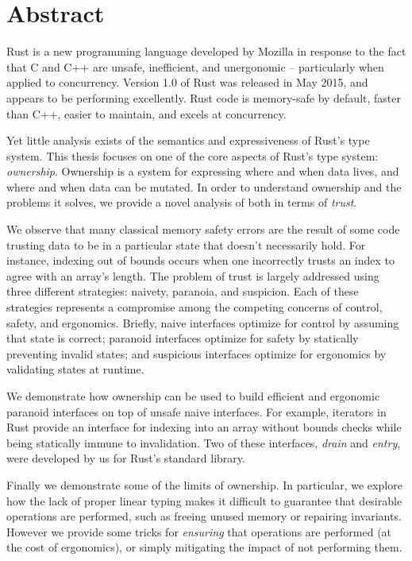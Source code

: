{}
\begingroup
\let\clearpage\relax
\let\cleardoublepage\relax
\let\cleardoublepage\relax

\chapter*{Abstract}
Rust is a new programming language developed by Mozilla in response to the fact
that C and C++ are unsafe, inefficient, and unergonomic -- particularly when
applied to concurrency. Version 1.0 of Rust was released in May 2015, and appears
to be performing excellently. Rust code is memory-safe
by default, faster than C++, easier to maintain, and excels at concurrency.

Yet little analysis exists of the semantics and expressiveness of Rust's type
system. This thesis focuses on one of the core aspects of Rust's type system:
\emph{ownership}. Ownership is a system for expressing where and when data lives, and
where and when data can be mutated. In order to understand ownership and the
problems it solves, we provide a novel analysis of both in terms of \emph{trust}.

We observe that many classical memory safety errors are the result of some
code trusting data to be in a particular state that doesn't necessarily hold.
For instance, indexing out of bounds occurs when one incorrectly trusts an
index to agree with an array's length. The problem of trust is largely addressed using three
different strategies: naivety, paranoia, and suspicion. Each of these strategies
represents a compromise among the competing concerns of control, safety, and
ergonomics. Briefly, naive interfaces optimize for control by assuming that
state is correct; paranoid interfaces optimize for safety by statically preventing
invalid states; and suspicious interfaces optimize for ergonomics by validating
states at runtime.

We demonstrate how ownership can be used to build efficient and ergonomic
paranoid interfaces on top of unsafe naive interfaces. For example,
iterators in Rust provide an interface for indexing into an array
without bounds checks while being statically immune to invalidation.
Two of these interfaces, \emph{drain} and \emph{entry}, were developed by us for Rust's
standard library.

Finally we demonstrate some of the limits of ownership. In particular, we
explore how the lack of proper linear typing makes it difficult to guarantee
that desirable operations are performed, such as freeing unused memory or
repairing invariants. However we provide some tricks for \emph{ensuring} that operations
are performed (at the cost of ergonomics), or simply mitigating the impact of not
performing them.

\endgroup

\vfill
